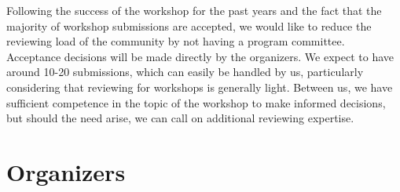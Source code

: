 \documentclass[10pt]{article}
\begin{document}
Following the success of the workshop for the past years and the fact
that the majority of workshop submissions are accepted, we would like to reduce
the reviewing load of the community by not having a program
committee. Acceptance decisions will be made directly by the
organizers. We expect to have around 10-20 submissions, which can
easily be handled by us, particularly considering that reviewing for
workshops is generally light. Between us, we have sufficient
competence in the topic of the workshop to make informed decisions,
but should the need arise, we can call on additional reviewing
expertise.

\section*{Organizers}
\end{document}
